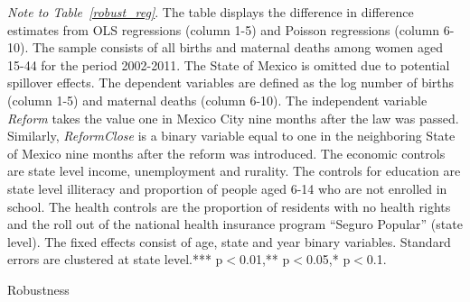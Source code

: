 \documentclass[a4paper, 11pt]{article}
\begin{document}
\begin{spacing}{1.4}
\begin{table}
\begin{threeparttable}
    
    \begin{tablenotes}  \footnotesize \item \textit{Note to Table~\ref{robust_reg}}. The table displays the difference in difference estimates from OLS regressions (column 1-5) and Poisson regressions (column 6-10). The sample consists of all births and maternal deaths among women aged 15-44 for the period 2002-2011. The State of Mexico is omitted due to potential spillover effects. The dependent variables are defined as the log number of births (column 1-5) and maternal deaths (column 6-10). The independent variable \textit{Reform} takes the value one in Mexico City nine months after the law was passed. Similarly, \textit{ReformClose} is a binary variable equal to one in the neighboring State of Mexico nine months after the reform was introduced. The economic controls are state level income, unemployment and rurality. The controls for education are state level illiteracy and proportion of people aged 6-14 who are not enrolled in school. The health controls are the proportion of residents with no health rights and the roll out of the national health insurance program ``Seguro Popular'' (state level). The fixed effects consist of age, state and year binary variables. Standard errors are clustered at state level.*** p$<$0.01,** p$<$0.05,* p$<$0.1.	 
    \end{tablenotes} 
  \end{threeparttable}
\end{table}
 
 
 \begin{table}\centering  \caption{Robustness} \label{robust_reg:b}
 	\begin{threeparttable}
 	
  
 			{\footnotesize 	}
 	 

\end{threeparttable}
\end{table}
\end{spacing}
\end{document}
